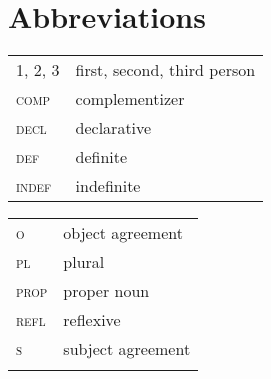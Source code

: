\documentclass[output=paper]{LSP/langsci}
\begin{document}
\section*{Abbreviations}
\begin{tabularx}{.45\textwidth}{lX}
1, 2, 3 & first, second, third person\\
\textsc{comp} & complementizer \\
 \textsc{decl} & declarative \\
 \textsc{def} & definite \\
 \textsc{indef} & indefinite \\
\end{tabularx}
\begin{tabularx}{.45\textwidth}{lX}
 \textsc{o} & {object} agreement \\
 \textsc{pl} & plural \\
 \textsc{prop} & proper noun \\
 \textsc{refl} & reflexive \\
 \textsc{s} & {subject} agreement\\ 
 \\
\end{tabularx}


{\sloppy 
\printbibliography[heading=subbibliography,notkeyword=this]
}

\let\eachwordtwo=\upshape
\end{document}

